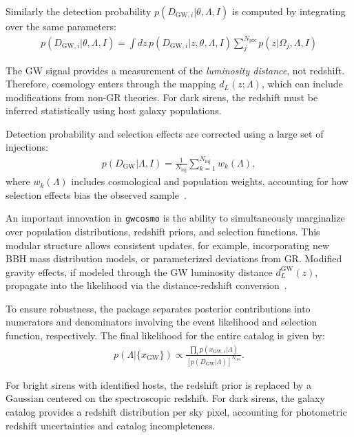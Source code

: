 Similarly the detection probability $p(D_{\mathrm{GW},i} |\theta, \Lambda, I)$ is computed by integrating over the same parameters:
\begin{align}
    p(D_{\mathrm{GW},i} | \theta, \Lambda, I) = \int dz\, p(D_{\mathrm{GW},i} | z, \theta, \Lambda, I) \sum_{j}^{N_{\mathrm{pix}}} p(z | \Omega_j,\Lambda, I)
\end{align}

The GW signal provides a measurement of the \textit{luminosity distance}, not redshift. Therefore, cosmology enters through the mapping $d_L(z; \Lambda)$, which can include modifications from non-GR theories. For dark sirens, the redshift must be inferred statistically using host galaxy populations. 

Detection probability and selection effects are corrected using a large set of injections:
\begin{align}
    p(D_\mathrm{GW} | \Lambda, I) = \frac{1}{N_{\mathrm{inj}}} \sum_{k=1}^{N_{\mathrm{inj}}} w_k(\Lambda),
\end{align}
where $w_k(\Lambda)$ includes cosmological and population weights, accounting for how selection effects bias the observed sample~\citep{chen2024testing, gray2022pixelated}.

An important innovation in \texttt{gwcosmo} is the ability to simultaneously marginalize over population distributions, redshift priors, and selection functions. This modular structure allows consistent updates, for example, incorporating new BBH mass distribution models, or parameterized deviations from GR. Modified gravity effects, if modeled through the GW luminosity distance $d_L^{\mathrm{GW}}(z)$, propagate into the likelihood via the distance-redshift conversion~\citep{chen2024testing}.

To ensure robustness, the package separates posterior contributions into numerators and denominators involving the event likelihood and selection function, respectively. The final likelihood for the entire catalog is given by:
\begin{align}
    p(\Lambda | \{x_\mathrm{GW}\}) \propto \frac{\prod_i p(x_{\mathrm{GW},i} | \Lambda)}{[p(D_\mathrm{GW} | \Lambda)]^{N_{\mathrm{det}}}}.
\end{align}

For bright sirens with identified hosts, the redshift prior is replaced by a Gaussian centered on the spectroscopic redshift. For dark sirens, the galaxy catalog provides a redshift distribution per sky pixel, accounting for photometric redshift uncertainties and catalog incompleteness.

